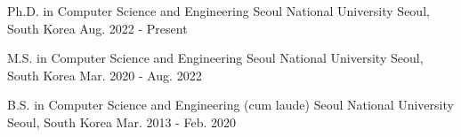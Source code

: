 

\begin{cventries}

  \cvedu
  {Ph.D. in Computer Science and Engineering} %
  {Seoul National University} %
  {Seoul, South Korea} %
  {Aug. 2022 - Present} %

  \cvedu
  {M.S. in Computer Science and Engineering} %
  {Seoul National University} %
  {Seoul, South Korea} %
  {Mar. 2020 - Aug. 2022} %

  \cvedu
  {B.S. in Computer Science and Engineering (cum laude)} %
  {Seoul National University} %
  {Seoul, South Korea} %
  {Mar. 2013 - Feb. 2020} %

\end{cventries}
